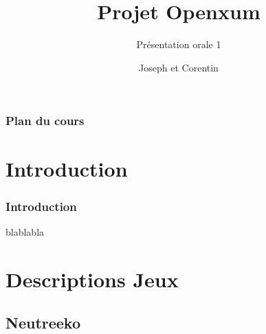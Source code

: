 \documentclass[11pt]{beamer}
\begin{document}
	
\author[J.Delaeter C.Ghyselinck]{Joseph  et Corentin }
\title{Projet Openxum}
\subtitle{Présentation orale 1}

  \begin{frame}
  \maketitle
  \end{frame}

  \begin{frame}
	\frametitle{Plan du cours}
	\tableofcontents
	\end{frame}
\section[Introduction]{Introduction}
  \begin{frame}
  \frametitle{Introduction}
  
  blablabla
  \end{frame}
\section[Description Jeux]{Descriptions Jeux} 

\subsection[Neutreeko]{Neutreeko} 
\end{document}
